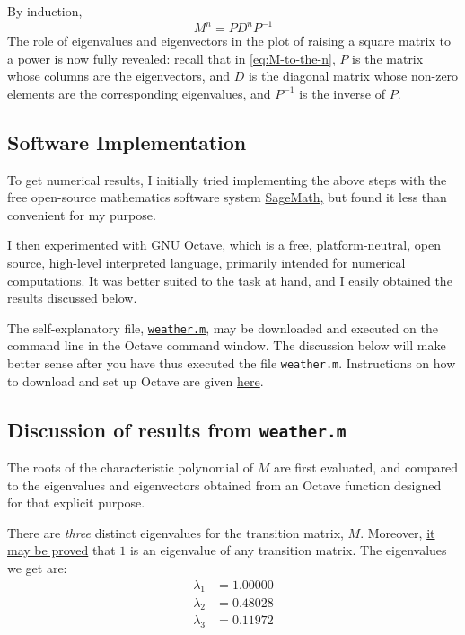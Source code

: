\documentclass[
  11pt,
  a4paper,
]{article}
\begin{document}
By induction, \begin{equation}
M^{n} = PD^{n}P^{-1}
\label{eq:M-to-the-n}\end{equation} The role of eigenvalues and
eigenvectors in the plot of raising a square matrix to a power is now
fully revealed: recall that in \cref{eq:M-to-the-n}, \(P\) is the matrix
whose columns are the eigenvectors, and \(D\) is the diagonal matrix
whose non-zero elements are the corresponding eigenvalues, and
\(P^{-1}\) is the inverse of \(P\).

\hypertarget{software-implementation}{%
\subsection{Software Implementation}\label{software-implementation}}

To get numerical results, I initially tried implementing the above steps
with the free open-source mathematics software system
\href{http://www.sagemath.org/}{SageMath,} but found it less than
convenient for my purpose.

I then experimented with \href{https://www.gnu.org/software/octave/}{GNU
Octave,} which is a free, platform-neutral, open source, high-level
interpreted language, primarily intended for numerical computations. It
was better suited to the task at hand, and I easily obtained the results
discussed below.

The self-explanatory file,
\href{auxiliary/weather.m}{\texttt{weather.m}}, may be downloaded and
executed on the command line in the Octave command window. The
discussion below will make better sense after you have thus executed the
file \texttt{weather.m}. Instructions on how to download and set up
Octave are given
\href{https://www.gnu.org/software/octave/download}{here}.

\hypertarget{discussion-of-results-from-weather.m}{%
\subsection{\texorpdfstring{Discussion of results from
\texttt{weather.m}}{Discussion of results from weather.m}}\label{discussion-of-results-from-weather.m}}

The roots of the characteristic polynomial of \(M\) are first evaluated,
and compared to the eigenvalues and eigenvectors obtained from an Octave
function designed for that explicit purpose.

There are \emph{three} distinct eigenvalues for the transition matrix,
\(M\). Moreover,
\href{http://www.math.cornell.edu/~mec/Winter2009/RalucaRemus/Lecture1/lecture1.html}{it
may be proved} that \(1\) is an eigenvalue of any transition matrix. The
eigenvalues we get are: \[
\begin{aligned}
\lambda_{1} &= 1.00000\\
\lambda_{2} &= 0.48028\\
\lambda_{3} &= 0.11972
\end{aligned}
\]
\end{document}
